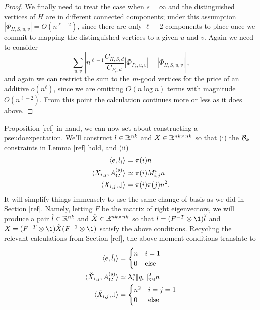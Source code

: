 \begin{proof}
    We finally need to treat the case when $s = \infty$ and the distinguished vertices of $H$ are in different connected components; under this assumption $|\Phi_{H,S,u,v}| = O(n^{\ell - 2})$, since there are only $\ell - 2$ components to place once we commit to mapping the distinguished vertices to a given $u$ and $v$. Again we need to consider
    $$
        \sum_{u,v}\left|n^{\ell - 1}\frac{C_{H,S,d}}{C_{P_s,d}}|\Phi_{P_s,u,v}| - |\Phi_{H,S,u,v}|\right|,
    $$
    and again we can restrict the sum to the $m$-good vertices for the price of an additive $o(n^\ell)$, since we are omitting $O(n\log n)$ terms with magnitude $O(n^{\ell - 2})$. From this point the calculation continues more or less as it does above.
\end{proof}
    
Proposition [ref] in hand, we can now set about constructing a pseudoexpectation. We'll construct $l\in \mathbb{R}^{nk}$ and $X \in \mathbb{R}^{nk\times nk}$ so that (i) the $\mathcal{B}_k$ constraints in Lemma [ref] hold, and (ii)
\begin{align*}
    \langle e, l_i \rangle &= \pi(i)n \\
    \langle X_{i,j}, A^{(s)}_{\boldsymbol{G}} \rangle &\simeq \pi(i)M_{i,j}^s n \\
    \langle X_{i,j}, \mathbb{J} \rangle &= \pi(i)\pi(j)n^2. 
\end{align*}
It will simplify things immensely to use the same change of basis as we did in Section [ref]. Namely, letting $F$ be the matrix of right eigenvectors, we will produce a pair $\check l \in \mathbb{R}^{nk}$ and $\check X \in \mathbb{R}^{nk\times nk}$ so that $l = (F^{-T} \otimes \1) \check l$ and $X = (F^{-T}\otimes \1) \check X (F^{-1} \otimes \1)$ satisfy the above conditions. Recycling the relevant calculations from Section [ref], the above moment conditions translate to
\begin{align*}
    \langle e, \check l_i \rangle &= \begin{cases} n & i = 1 \\ 0 & \text{else} \end{cases} \\
    \langle \check X_{i,j}, A^{(s)}_{\boldsymbol{G}} \rangle &\simeq \lambda_i^s \|q_s\|^2_{\textsc{km}} n \\
    \langle \check X_{i,j}, \mathbb{J} \rangle &= \begin{cases} n^2 & i=j = 1 \\ 
    0 & \text{else} \end{cases}
\end{align*}

